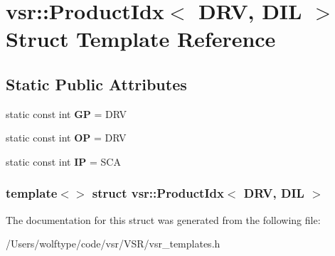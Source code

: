 \hypertarget{structvsr_1_1_product_idx_3_01_d_r_v_00_01_d_i_l_01_4}{\section{vsr\-:\-:Product\-Idx$<$ D\-R\-V, D\-I\-L $>$ Struct Template Reference}
\label{structvsr_1_1_product_idx_3_01_d_r_v_00_01_d_i_l_01_4}
}
\subsection*{Static Public Attributes}
\begin{DoxyCompactItemize}
\item 
\hypertarget{structvsr_1_1_product_idx_3_01_d_r_v_00_01_d_i_l_01_4_a2ba23cd77b6ebdac6d94658da179e27c}{static const int {\bfseries G\-P} = D\-R\-V}\label{structvsr_1_1_product_idx_3_01_d_r_v_00_01_d_i_l_01_4_a2ba23cd77b6ebdac6d94658da179e27c}

\item 
\hypertarget{structvsr_1_1_product_idx_3_01_d_r_v_00_01_d_i_l_01_4_a7558440d8f7730f12c80fcd28288d368}{static const int {\bfseries O\-P} = D\-R\-V}\label{structvsr_1_1_product_idx_3_01_d_r_v_00_01_d_i_l_01_4_a7558440d8f7730f12c80fcd28288d368}

\item 
\hypertarget{structvsr_1_1_product_idx_3_01_d_r_v_00_01_d_i_l_01_4_a72503ac6b5feb5dee8898ff98b0d04e2}{static const int {\bfseries I\-P} = S\-C\-A}\label{structvsr_1_1_product_idx_3_01_d_r_v_00_01_d_i_l_01_4_a72503ac6b5feb5dee8898ff98b0d04e2}

\end{DoxyCompactItemize}
\subsubsection*{template$<$$>$ struct vsr\-::\-Product\-Idx$<$ D\-R\-V, D\-I\-L $>$}



The documentation for this struct was generated from the following file\-:\begin{DoxyCompactItemize}
\item 
/\-Users/wolftype/code/vsr/\-V\-S\-R/vsr\-\_\-templates.\-h\end{DoxyCompactItemize}

